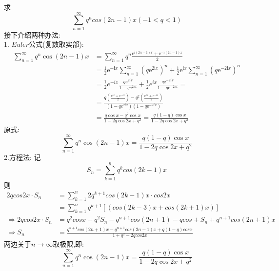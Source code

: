 \documentclass{ctexart}
\begin{document}
 \begin{tcolorbox}[title = {求和问题},colbacktitle=red!35!white,colback=white,arc = 3mm, outer arc = 3mm,fonttitle = \itshape, fontupper = \itshape, fontlower = \itshape]
 求$$\sum_{n=1}^{\infty} q^{n} cos(2n-1)x\left(-1 < q <1 \right) $$
	接下介绍两种办法:\\
	1. $Euler$公式(复数取实部):
	\begin{align*}
		\sum_{n=1}^{\infty} q^{n} \cos (2 n-1) x &= 
		\sum_{n=1}^{\infty} q^{n} \frac{\mathrm{e}^{\mathrm{i}(2 n-1) x}+\mathrm{e}^{-i(2 n-1) x}}{2}  \\
		&=\frac{1}{2} \mathrm{e}^{-\mathrm{i} x} \sum_{n=1}^{\infty}\left(q \mathrm{e}^{2 \mathrm{i} x}\right)^{n}+\frac{1}{2} \mathrm{e}^{\mathrm{i} x} \sum_{n=1}^{\infty}\left(q \mathrm{e}^{-2 \mathrm{i} x}\right)^{n} \\
		& =\frac{1}{2} e^{-i x} \frac{q e^{2 i x}}{1-q e^{2 i x}}+\frac{1}{2} e^{i x} \frac{q \mathrm{e}^{-2 i x}}{1-q \mathrm{e}^{-2 i x}}=\\
		&=\frac{q\left(\frac{e^{i x}+e^{-i x}}{2}\right)-q^{2}\left(\frac{e^{i x}+e^{-i x}}{2}\right)}{\left(1-q e^{2 i x}\right)\left(1-q \mathrm{e}^{-2 i x}\right)} \\
		&=\frac{q \cos x-q^{2} \cos x}{1-2 q \cos 2 x+q^{2}}=\frac{q(1-q) \cos x}{1-2 q \cos 2 x+q^{2}}
	\end{align*}
 原式:
  $$
  \sum_{n=1}^{\infty} q^{n} \cos (2 n-1)x=\frac{q(1-q) \cos x}{1-2 q \cos 2x+q^{2}}
  $$
  2.方程法:
    记$$ S_{n}=\sum_{k=1}^{n} q^{k} cos(2k-1)x$$则
   \begin{align*}
     2qcos2x \cdot S_{n} &=\sum_{k=1}^{n} 2q^{k+1} cos(2k-1)x \cdot cos2x\\ &=\sum_{k=1}^{n} q^{k+1}[\left( cos(2k-3)x+cos(2k+1)x\right)] \\
      \Rightarrow 2qcos2x \cdot S_{n} &=q^{2}cosx+q^{2}S_{n}-q^{n+1}cos(2n+1)-qcos+S_{n}+q^{n+1}cos(2n+1)x \\
      \Rightarrow S_{n}&=\frac{q^{n+1}cos(2n+1)x-q^{n+1}cos(2n-1)x+q(1-q)cosx}{1+q^{2}-2qcos2x}
    \end{align*}
两边关于$n \to \infty$取极限,即:
 $$
\sum_{n=1}^{\infty} q^{n} \cos (2 n-1)x=\frac{q(1-q) \cos x}{1-2 q \cos 2x+q^{2}}
$$
\end{tcolorbox}
\end{document}
